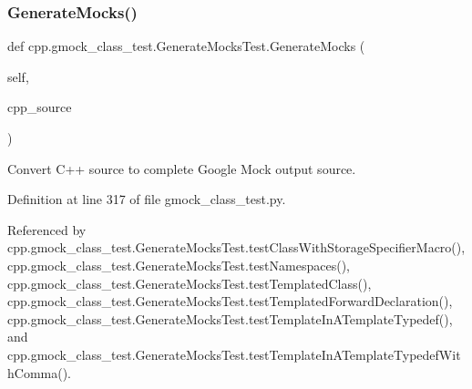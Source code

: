 \subsubsection{\texorpdfstring{Generate\+Mocks()}{GenerateMocks()}}
{\footnotesize\ttfamily def cpp.\+gmock\+\_\+class\+\_\+test.\+Generate\+Mocks\+Test.\+Generate\+Mocks (\begin{DoxyParamCaption}\item[{}]{self,  }\item[{}]{cpp\+\_\+source }\end{DoxyParamCaption})}

\begin{DoxyVerb}Convert C++ source to complete Google Mock output source.\end{DoxyVerb}
 

Definition at line 317 of file gmock\+\_\+class\+\_\+test.\+py.



Referenced by cpp.\+gmock\+\_\+class\+\_\+test.\+Generate\+Mocks\+Test.\+test\+Class\+With\+Storage\+Specifier\+Macro(), cpp.\+gmock\+\_\+class\+\_\+test.\+Generate\+Mocks\+Test.\+test\+Namespaces(), cpp.\+gmock\+\_\+class\+\_\+test.\+Generate\+Mocks\+Test.\+test\+Templated\+Class(), cpp.\+gmock\+\_\+class\+\_\+test.\+Generate\+Mocks\+Test.\+test\+Templated\+Forward\+Declaration(), cpp.\+gmock\+\_\+class\+\_\+test.\+Generate\+Mocks\+Test.\+test\+Template\+In\+A\+Template\+Typedef(), and cpp.\+gmock\+\_\+class\+\_\+test.\+Generate\+Mocks\+Test.\+test\+Template\+In\+A\+Template\+Typedef\+With\+Comma().


